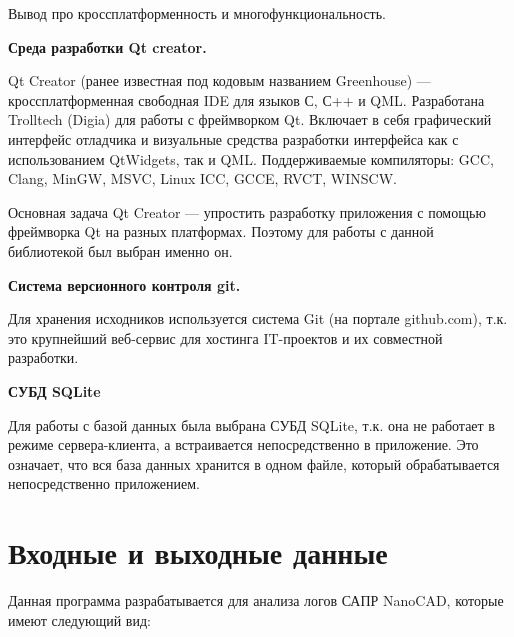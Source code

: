 
Вывод про кроссплатформенность и многофункциональность.

\noindent\textbf{Среда разработки Qt creator.}

Qt Creator (ранее известная под кодовым названием Greenhouse) — кроссплатформенная свободная IDE для языков С, С++ и QML. Разработана Trolltech (Digia) для работы с фреймворком Qt. Включает в себя графический интерфейс отладчика и визуальные средства разработки интерфейса как с использованием QtWidgets, так и QML. Поддерживаемые компиляторы: GCC, Clang, MinGW, MSVC, Linux ICC, GCCE, RVCT, WINSCW.

Основная задача Qt Creator — упростить разработку приложения с помощью фреймворка Qt на разных платформах. Поэтому для работы с данной библиотекой был выбран именно он.

\noindent\textbf{Система версионного контроля git.}

Для хранения исходников используется система Git (на портале github.com), т.к. это крупнейший веб-сервис для хостинга IT-проектов и их совместной разработки. %

\noindent\textbf{СУБД SQLite}

Для работы с базой данных была выбрана СУБД SQLite, т.к. она не работает в режиме сервера-клиента, а встраивается непосредственно в приложение. Это означает, что вся база данных хранится в одном файле, который обрабатывается непосредственно приложением.

\section{Входные и выходные данные}
Данная программа разрабатывается для анализа логов САПР NanoCAD, которые имеют следующий вид:


